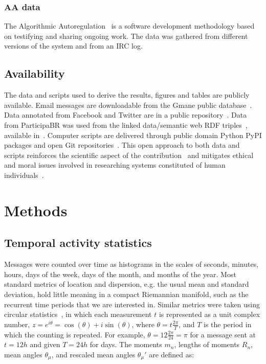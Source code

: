 \subsubsection{AA data}
The Algorithmic Autoregulation~\cite{aa} is a software development
methodology based on testifying and sharing ongoing work.
The data was gathered from different versions of the system and from an IRC
log. 

\subsection{Availability}
The data and scripts used to derive the results, figures and tables are publicly available. Email messages are downloadable from the Gmane public database~\cite{Gmanewikipedia}.
Data annotated from Facebook and Twitter are in a public repository~\cite{fbtwData}.
Data from ParticipaBR was used from the linked data/semantic web RDF triples~\cite{opa}, available in~\cite{datahub}.
Computer scripts are delivered through public domain Python PyPI packages and open Git repositories~\cite{gmanePack}.
This open approach to both data and scripts reinforces the scientific aspect of the contribution~\cite{openSci} and mitigates ethical and moral issues involved in researching systems constituted of human individuals~\cite{anPhy,ccs15}.

\section{Methods}\label{sec:carac}

\subsection{Temporal activity statistics}\label{sec:mtime}
Messages were counted over time as histograms in the scales of seconds,
minutes, hours, days of the week, days of the month, and months of the year.
Most standard metrics of location and dispersion, e.g. the usual mean and
standard deviation, hold little meaning in a compact Riemannian manifold,
such as the recurrent time periods that we are interested in.
Similar metrics were taken using circular statistics~\cite{directionalStats},
in which each measurement $t$ is represented as a unit complex number,
$z=e^{i\theta}=\cos(\theta)+i\sin(\theta)$, where $\theta=t\frac{2\pi}{T}$,
and $T$ is the period in which the counting is repeated.
For example, $\theta=12\frac{2\pi}{24}=\pi$ for a message sent at $t=12h$ and given $T=24h$ for days.
The moments $m_n$, lengths of moments $R_n$, mean angles $\theta_\mu$, and rescaled mean angles $\theta_\mu'$ are defined as:

